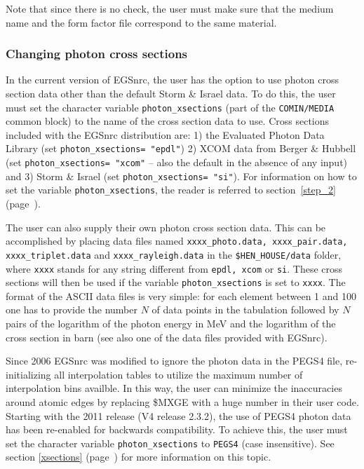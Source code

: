 Note that since there is no check, the user must make sure that the medium name and
the form factor file correspond to the same material.

\subsubsection{Changing photon cross sections}
\label{photon_xsect}

In the current version of EGSnrc, the user has the option to use
photon cross section data other than the default
Storm \& Israel data.  To do this, the user must
set the character variable {\tt photon\_xsections} (part of the
{\tt COMIN/MEDIA} common block) to the name of the cross section
data to use.  Cross sections included with the EGSnrc distribution
are: 1) the Evaluated Photon Data
Library\cite{Cu97a} (set {\tt photon\_xsections= "epdl"})
2) XCOM data from Berger \& Hubbell\cite{BH87} (set {\tt photon\_xsections= "xcom"}
-- also the default in the absence of any input)
and 3) Storm \& Israel\cite{SI70} (set {\tt photon\_xsections= "si"}). For information on how
to set the variable {\tt photon\_xsections}, the reader
is referred to section~\ref{step_2} (page~\pageref{photon_xsections_description}).

The user can also supply their own photon cross section data.
This can be accomplished by placing data files named
{\tt xxxx\_photo.data, xxxx\_pair.data, xxxx\_triplet.data} and {\tt xxxx\_rayleigh.data}
in the {\tt \$HEN\_HOUSE/data} folder, where {\tt xxxx} stands for any string different
from {\tt epdl, xcom} or {\tt si}. These cross sections will then be used if
the variable {\tt photon\_xsections} is set to {\tt xxxx}. The format of the
ASCII data files is very simple: for each element between 1 and 100 one has to
provide the number $N$ of data points in the tabulation followed by $N$
pairs of the logarithm of the photon energy in MeV and the logarithm of the
cross section in barn (see also one of the data files provided with EGSnrc).

Since 2006 EGSnrc was modified to ignore the photon data in the PEGS4
file, re-initializing all interpolation tables to utilize the
maximum number of interpolation bins availble. In this way, the user
can minimize the inaccuracies around atomic edges by replacing \$MXGE with
a huge number in their user code. Starting with the 2011 release
(V4 release 2.3.2), the use of PEGS4 photon data has been re-enabled for
backwards compatibility.
To achieve this, the user must set the character variable
{\tt photon\_xsections} to {\tt PEGS4} (case insensitive). See
section \ref{xsections} (page~\pageref{xsections}) for more
information on this topic.

